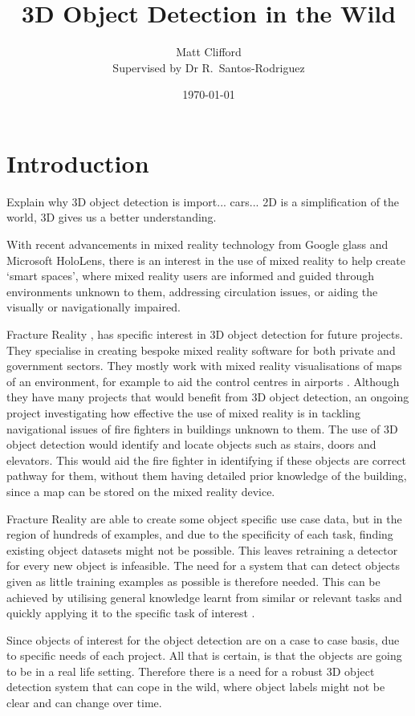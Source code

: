 \documentclass[11pt]{article}
\title{3D Object Detection in the Wild}
\author{Matt Clifford \\ Supervised by Dr R.\ Santos-Rodriguez}
\date{\today}
\begin{document}
\maketitle

\section{Introduction}
Explain why 3D object detection is import... cars... 2D is a simplification of the world, 3D gives us a better understanding.



With recent advancements in mixed reality technology from Google glass and Microsoft HoloLens, there is an interest in the use of mixed reality to help create `smart spaces', where mixed reality users are informed and guided through environments unknown to them, addressing circulation issues, or aiding the visually or navigationally impaired.

Fracture Reality \cite{fracture}, has specific interest in 3D object detection for future projects. They specialise in creating bespoke mixed reality software for both private and government sectors. They mostly work with mixed reality visualisations of maps of an environment, for example to aid the control centres in airports \cite{youtube}. Although they have many projects that would benefit from 3D object detection, an ongoing project investigating how effective the use of mixed reality is in tackling navigational issues of fire fighters in buildings unknown to them. The use of 3D object detection would identify and locate objects such as stairs, doors and elevators. This would aid the fire fighter in identifying if these objects are correct pathway for them, without them having detailed prior knowledge of the building, since a map can be stored on the mixed reality device.

Fracture Reality are able to create some object specific use case data, but in the region of hundreds of examples, and due to the specificity of each task, finding existing object datasets might not be possible. This leaves retraining a detector for every new object is infeasible. The need for a system that can detect objects given as little training examples as possible is therefore needed. This can be achieved by utilising general knowledge learnt from similar or relevant tasks and quickly applying it to the specific task of interest \cite{DeCAF}.

Since objects of interest for the object detection are on a case to case basis, due to specific needs of each project. All that is certain, is that the objects are going to be in a real life setting. Therefore there is a need for a robust 3D object detection system that can cope in the wild, where object labels might not be clear and can change over time.
\end{document}
